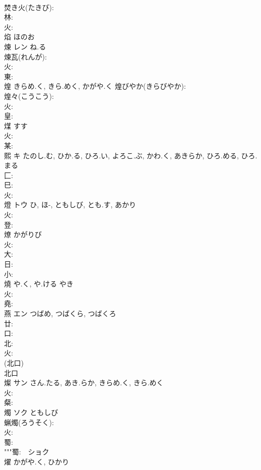 \documentclass[8pt]{extreport}
\begin{document}
\begin{CJK}{UTF8}{min}
\\	焚き火(たきび): 
\\	林: 
\\	火: 
\\	焰		ほのお				
\\	煉	レン	ね.る		
\\	煉瓦(れんが): 
\\	火: 
\\	東: 
\\	煌		きらめ.く, きら.めく, かがや.く			煌びやか(きらびやか): 
\\	煌々(こうこう): 
\\	火: 
\\	皇: 
\\	煤		すす				
\\	火: 
\\	某: 
\\	熙	キ	たのし.む, ひか.る, ひろ.い, よろこ.ぶ, かわ.く, あきらか, ひろ.める, ひろ.まる		
\\	匚: 
\\	巳: 
\\	火: 
\\	燈	トウ	ひ, ほ-, ともしび, とも.す, あかり		
\\	火: 
\\	登: 
\\	燎		かがりび				
\\	火: 
\\	大: 
\\	日: 
\\	小: 
\\	燒		や.く, や.ける	やき			
\\	火: 
\\	堯: 
\\	燕	エン	つばめ, つばくら, つばくろ		
\\	廿: 
\\	口: 
\\	北: 
\\	火: 
\\	(北口) 
\\	北口 
\\	燦	サン	さん.たる, あき.らか, きらめ.く, きら.めく		
\\	火: 
\\	粲: 
\\	燭	ソク	ともしび		
\\	蝋燭(ろうそく): 
\\	火: 
\\	蜀: 
\\	"""蜀:　ショク　
\\	燿		かがや.く, ひかり				

\end{CJK}
\end{document}
